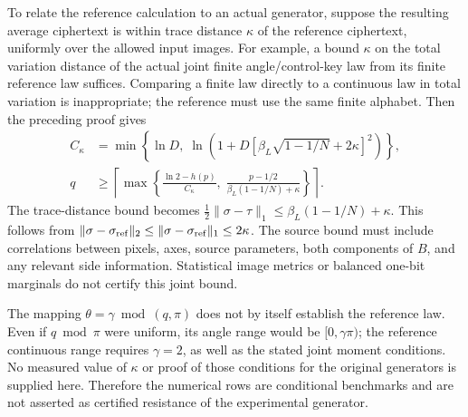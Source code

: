 {To relate the reference calculation to an actual generator, suppose
the resulting average ciphertext is within trace distance $\kappa$
of the reference ciphertext, uniformly over the allowed input images.
For example, a bound $\kappa$ on the total variation distance of the
actual joint finite angle/control-key law from its finite reference
law suffices. Comparing a finite law directly to a continuous law in
total variation is inappropriate; the reference must use the same
finite alphabet. Then the preceding proof gives
\begin{equation}
\label{eq:qef_source_robust_bound}
\begin{split}
 C_{\kappa}&=\min\!\left\{\ln D,\;
 \ln\!\left(1+D[\beta_L\sqrt{1-1/N}+2\kappa]^2\right)\right\},\\
 q&\geq\left\lceil\max\!\left\{
 \frac{\ln2-h(p)}{C_\kappa},\;
 \frac{p-1/2}{\beta_L(1-1/N)+\kappa}
 \right\}\right\rceil.
\end{split}
\end{equation}
The trace-distance bound becomes
$\frac12\|\sigma-\tau\|_1\leq\beta_L(1-1/N)+\kappa$.
This follows from $\|\sigma-\sigma_{\rm ref}\|_2
\leq\|\sigma-\sigma_{\rm ref}\|_1\leq2\kappa$.
The source bound must include correlations between pixels, axes,
source parameters, both components of $B$, and any relevant side
information. Statistical image metrics or balanced one-bit marginals
do not certify this joint bound.

The mapping $\theta=\gamma\bmod(q,\pi)$ does not by itself establish
the reference law. Even if $q\bmod\pi$ were uniform, its angle range
would be $[0,\gamma\pi)$; the reference continuous range requires
$\gamma=2$, as well as the stated joint moment conditions. No measured
value of $\kappa$ or proof of those conditions for the original
generators is supplied here. Therefore the numerical rows are
conditional benchmarks and are not asserted as certified resistance
of the experimental generator.

}
